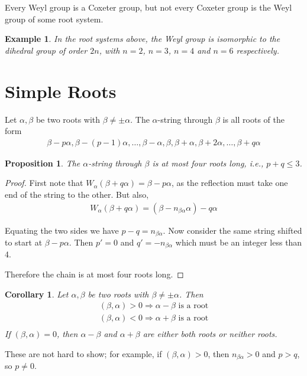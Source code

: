 \documentclass[10pt,a4paper]{article}
\newtheorem{prop}[theorem]{Proposition}
\newtheorem{cor}[theorem]{Corollary}
\newtheorem{example}[theorem]{Example}
\begin{document}
Every Weyl group is a Coxeter group, but not every Coxeter group is
the Weyl group of some root system.

\begin{example}
In the root systems above, the Weyl group is isomorphic to the dihedral group of order $2n$, with $n=2$, $n=3$, $n=4$ and $n=6$ respectively.
\end{example}

\section{Simple Roots}

Let $\alpha, \beta$ be two roots with $\beta \neq \pm \alpha$. The $\alpha$-string through $\beta$ is all roots of the form
\begin{align*}
	\beta - p \alpha, \beta - (p - 1) \alpha, \dots, \beta - \alpha, \beta, \beta + \alpha, \beta + 2 \alpha, \dots, \beta + q \alpha
\end{align*}

\begin{prop}
The $\alpha$-string through $\beta$ is at most four roots long, i.e., $p + q \leq 3$.
\end{prop}
\begin{proof}
First note that $W_\alpha(\beta + q \alpha) = \beta - p \alpha$, as the reflection must take one end of the string to the other. But also,
\begin{align*}
	W_\alpha(\beta + q \alpha) = (\beta - n_{\beta \alpha} \alpha) - q \alpha
\end{align*}

Equating the two sides we have $p - q = n_{\beta \alpha}$. Now consider the same string shifted to start at $\beta - p \alpha$. Then $p' = 0$ and $q' = -n_{\beta \alpha}$ which must be an integer less than 4.

Therefore the chain is at most four roots long.
\end{proof}

\begin{cor}
Let $\alpha, \beta$ be two roots with $\beta \neq \pm \alpha$. Then
\begin{align*}
	(\beta, \alpha) > 0 \Rightarrow \alpha - \beta \text{ is a root} \\
	(\beta, \alpha) < 0 \Rightarrow \alpha + \beta \text{ is a root} \\
\end{align*}
If $(\beta, \alpha) = 0$, then $\alpha - \beta$ and $\alpha + \beta$ are either both roots or neither roots.
\end{cor}
These are not hard to show; for example, if $(\beta, \alpha) > 0$, then $n_{\beta \alpha} > 0$ and $p > q$, so $p \neq 0$.
\end{document}
